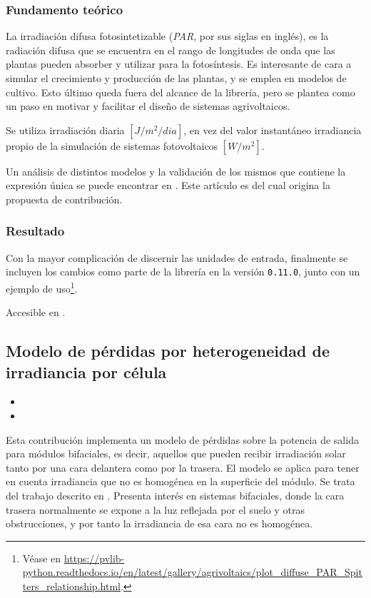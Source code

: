 \subsubsection{Fundamento teórico}

La irradiación difusa fotosintetizable (\textit{PAR}, por sus siglas en inglés), es la radiación difusa que se encuentra en el rango de longitudes de onda que las plantas pueden absorber y utilizar para la fotosíntesis. Es interesante de cara a simular el crecimiento y producción de las plantas, y se emplea en modelos de cultivo. Esto último queda fuera del alcance de la librería, pero se plantea como un paso en motivar y facilitar el diseño de sistemas agrivoltaicos.

Se utiliza irradiación diaria $[J/m^2/dia]$, en vez del valor instantáneo irradiancia propio de la simulación de sistemas fotovoltaicos $[W/m^2]$.

Un análisis de distintos modelos y la validación de los mismos que contiene la expresión única se puede encontrar en \cite{Ma_Lu_Zainali_Stridh_Avelin_Amaducci_Colauzzi_Campana_2022}. Este artículo es del cual origina la propuesta de contribución.

\subsubsection{Resultado}

Con la mayor complicación de discernir las unidades de entrada, finalmente se incluyen los cambios como parte de la librería en la versión \texttt{0.11.0}, junto con un ejemplo de uso\footnote{Véase en \url{https://pvlib-python.readthedocs.io/en/latest/gallery/agrivoltaics/plot_diffuse_PAR_Spitters_relationship.html}.}.

Accesible en .

\subsection{Modelo de pérdidas por heterogeneidad de irradiancia por célula} \label{sct:desarrollo:contribuciones_cientificas:heterogeneidad_irradiancia}

\begin{itemize}
    \item {}
    \item {}
\end{itemize}

Esta contribución implementa un modelo de pérdidas sobre la potencia de salida para módulos bifaciales, es decir, aquellos que pueden recibir irradiación solar tanto por una cara delantera como por la trasera. El modelo se aplica para tener en cuenta irradiancia que no es homogénea en la superficie del módulo. Se trata del trabajo descrito en \cite{Deline_Ayala_Pelaez_MacAlpine_Olalla_2020}.
Presenta interés en sistemas bifaciales, donde la cara trasera normalmente se expone a la luz reflejada por el suelo y otras obstrucciones, y por tanto la irradiancia de esa cara no es homogénea.

